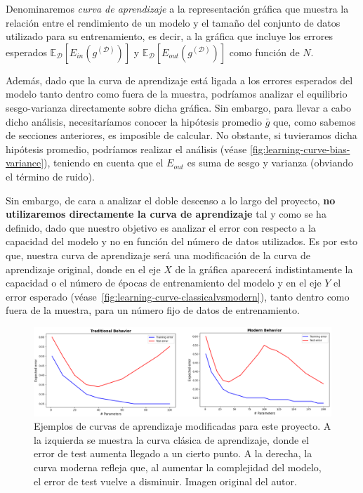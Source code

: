 Denominaremos \emph{curva de aprendizaje} a la representación gráfica que muestra la relación entre el rendimiento de un modelo y el tamaño del conjunto de datos utilizado para su entrenamiento, es decir, a la gráfica que incluye los errores esperados $\mathbb{E}_{\mathcal{D}}[E_{in}(g^{(\mathcal{D})})]$ y $\mathbb{E}_{\mathcal{D}}[E_{out}(g^{(\mathcal{D})})]$ como función de $N$.\newline

Además, dado que la curva de aprendizaje está ligada a los errores esperados del modelo tanto dentro como fuera de la muestra, podríamos analizar el equilibrio sesgo-varianza directamente sobre dicha gráfica. Sin embargo, para llevar a cabo dicho análisis, necesitaríamos conocer la hipótesis promedio $\bar{g}$ que, como sabemos de secciones anteriores, es imposible de calcular. No obstante, si tuvieramos dicha hipótesis promedio, podríamos realizar el análisis (véase \autoref{fig:learning-curve-bias-variance}), teniendo en cuenta que el $E_{out}$ es suma de sesgo y varianza (obviando el término de ruido).\newline

Sin embargo, de cara a analizar el doble descenso a lo largo del proyecto, \textbf{no utilizaremos directamente la curva de aprendizaje} tal y como se ha definido, dado que nuestro objetivo es analizar el error con respecto a la capacidad del modelo y no en función del número de datos utilizados. Es por esto que, nuestra curva de aprendizaje será una modificación de la curva de aprendizaje original, donde en el eje $X$ de la gráfica aparecerá indistintamente la capacidad o el número de épocas de entrenamiento del modelo y en el eje $Y$ el error esperado (véase~\autoref{fig:learning-curve-classicalvsmodern}), tanto dentro como fuera de la muestra, para un número fijo de datos de entrenamiento.\newline

\begin{figure}[h]
    \centering
    \includegraphics[width=0.9\linewidth]{img/learning-curve-classicalvsmodern.png}
    \caption[Ejemplos de curvas de aprendizaje modificadas para este proyecto.] {Ejemplos de curvas de aprendizaje modificadas para este proyecto. A la izquierda se muestra la curva clásica de aprendizaje, donde el error de test aumenta llegado a un cierto punto. A la derecha, la curva moderna refleja que, al aumentar la complejidad del modelo, el error de test vuelve a disminuir. Imagen original del autor.}\label{fig:learning-curve-classicalvsmodern}
\end{figure}

